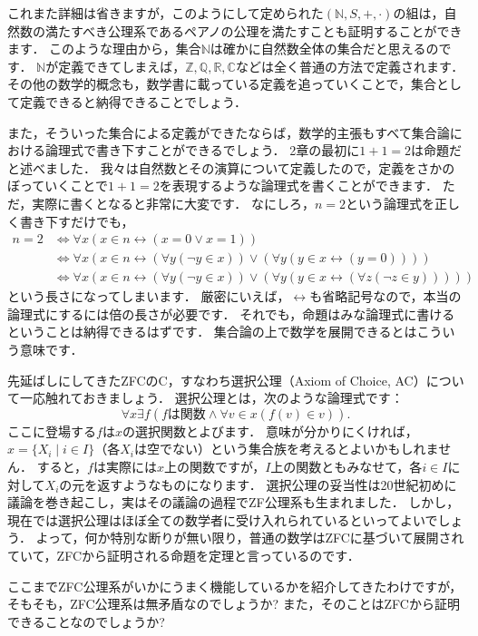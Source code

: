 \documentclass[./main]{subfiles}
\newcommand{\mbb}{\mathbb}
\begin{document}
これまた詳細は省きますが，このようにして定められた$(\mbb{N}, S, +, \cdot)$の組は，自然数の満たすべき公理系であるペアノの公理を満たすことも証明することができます．
このような理由から，集合$\mbb{N}$は確かに自然数全体の集合だと思えるのです．
$\mbb{N}$が定義できてしまえば，$\mbb{Z}, \mbb{Q}, \mbb{R}, \mbb{C}$などは全く普通の方法で定義されます．
その他の数学的概念も，数学書に載っている定義を追っていくことで，集合として定義できると納得できることでしょう．

また，そういった集合による定義ができたならば，数学的主張もすべて集合論における論理式で書き下すことができるでしょう．
2章の最初に$1+1=2$は命題だと述べました．
我々は自然数とその演算について定義したので，定義をさかのぼっていくことで$1+1=2$を表現するような論理式を書くことができます．
ただ，実際に書くとなると非常に大変です．
なにしろ，$n=2$という論理式を正しく書き下すだけでも，
\begin{align*}
n=2 &\iff \forall x(x\in n\leftrightarrow (x=0 \lor x=1))\\
&\iff \forall x(x\in n\leftrightarrow (\forall y(\neg y\in x))\lor (\forall y(y\in x\leftrightarrow (y = 0))))\\
&\iff \forall x(x\in n\leftrightarrow (\forall y(\neg y\in x))\lor (\forall y(y\in x\leftrightarrow (\forall z(\neg z\in y)))))
\end{align*}
という長さになってしまいます．
厳密にいえば，$\leftrightarrow$も省略記号なので，本当の論理式にするには倍の長さが必要です．
それでも，命題はみな論理式に書けるということは納得できるはずです．
集合論の上で数学を展開できるとはこういう意味です．


先延ばしにしてきたZFCのC，すなわち選択公理（Axiom of Choice, AC）について一応触れておきましょう．
選択公理とは，次のような論理式です：
\[
\forall x\exists f(f\text{は関数}\land\forall v\in x(f(v)\in v)).
\]
ここに登場する$f$は$x$の選択関数とよびます．
意味が分かりにくければ，$x=\{X_i \mid i\in I\}$（各$X_i$は空でない）という集合族を考えるとよいかもしれません．
すると，$f$は実際には$x$上の関数ですが，$I$上の関数ともみなせて，各$i\in I$に対して$X_i$の元を返すようなものになります．
選択公理の妥当性は20世紀初めに議論を巻き起こし，実はその議論の過程でZF公理系も生まれました．
しかし，現在では選択公理はほぼ全ての数学者に受け入れられているといってよいでしょう．
よって，何か特別な断りが無い限り，普通の数学はZFCに基づいて展開されていて，ZFCから証明される命題を定理と言っているのです．


ここまでZFC公理系がいかにうまく機能しているかを紹介してきたわけですが，そもそも，ZFC公理系は無矛盾なのでしょうか?
また，そのことはZFCから証明できることなのでしょうか?
\end{document}
